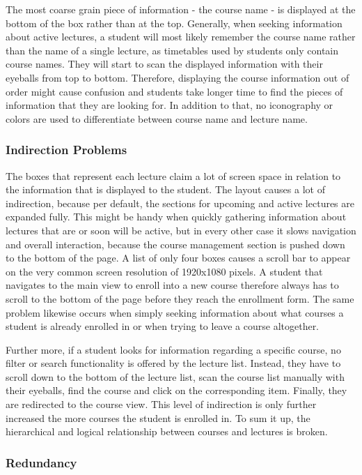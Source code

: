 The most coarse grain piece of information - the course name - is displayed at the bottom of the box rather than at the top. Generally, when seeking information about active lectures, a student will most likely remember the course name rather than the name of a single lecture, as timetables used by students only contain course names.
They will start to scan the displayed information with their eyeballs from top to bottom. Therefore, displaying the course information out of order might cause confusion and students take longer time to find the pieces of information that they are looking for.
In addition to that, no iconography or colors are used to differentiate between course name and lecture name.

\subsubsection{Indirection Problems}

The boxes that represent each lecture claim a lot of screen space in relation to the information that is displayed to the student. The layout causes a lot of indirection, because per default, the sections for upcoming and active lectures are expanded fully. This might be handy when quickly gathering information about lectures that are or soon will be active, but in every other case it slows navigation and overall interaction, because the course management section is pushed down to the bottom of the page.
A list of only four boxes causes a scroll bar to appear on the very common screen resolution of 1920x1080 pixels. A student that navigates to the main view to enroll into a new course therefore always has to scroll to the bottom of the page before they reach the enrollment form. The same problem likewise occurs when simply seeking information about what courses a student is already enrolled in or when trying to leave a course altogether. 

Further more, if a student looks for information regarding a specific course, no filter or search functionality is offered by the lecture list. Instead, they have to scroll down to the bottom of the lecture list, scan the course list manually with their eyeballs, find the course and click on the corresponding item. Finally, they are redirected to the course view. This level of indirection is only further increased the more courses the student is enrolled in. 
To sum it up, the hierarchical and logical relationship between courses and lectures is broken. 

\subsubsection{Redundancy}

